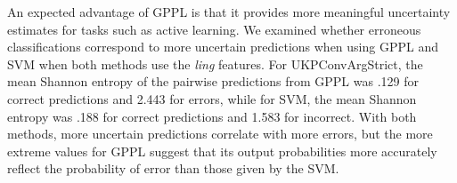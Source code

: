 % 


An expected advantage of GPPL is that it provides more meaningful uncertainty estimates for tasks such as active learning. 
We examined whether erroneous classifications correspond to more uncertain predictions
when using GPPL and SVM when both methods use the \emph{ling} features.
For UKPConvArgStrict, the mean Shannon entropy
of the pairwise predictions from GPPL 
was .129 for correct predictions and 2.443 for errors,
while for SVM, the mean Shannon entropy was  .188 for correct predictions and 
1.583 for incorrect.
With both methods, more uncertain predictions correlate with more errors,
but the more extreme values for GPPL suggest that its output probabilities more 
accurately reflect the probability of error than those given by the SVM.


